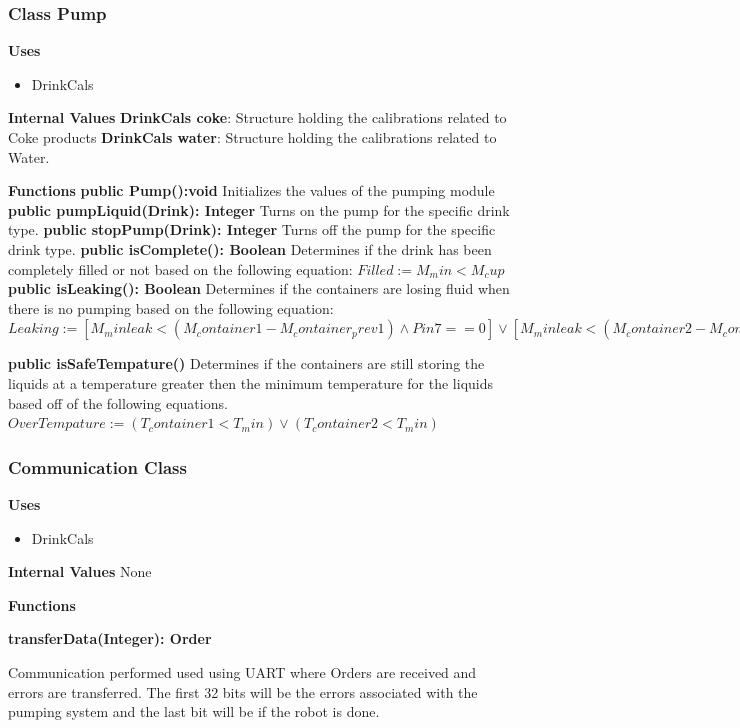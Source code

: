 \documentclass [10pt]{article}
\begin{document}
\subsubsection{Class Pump}

\textbf{Uses}

\begin{itemize}
	\item DrinkCals
\end{itemize}

\textbf{Internal Values}
\textbf{DrinkCals coke}: Structure holding the calibrations related to Coke products
\textbf{DrinkCals water}: Structure holding the calibrations related to Water.

\textbf{Functions}
\textbf{public Pump():void}
Initializes the values of the pumping module
\textbf{public pumpLiquid(Drink): Integer}
Turns on the pump for the specific drink type.
\textbf{public stopPump(Drink): Integer}
Turns off the pump for the specific drink type.
\textbf{public isComplete(): Boolean}
Determines if the drink has been completely filled or not based on the following equation:
$Filled := M_min < M_cup$
\textbf{public isLeaking(): Boolean}
Determines if the containers are losing fluid when there is no pumping based on the following equation:
$Leaking := [M_minleak < (M_container1 - M_container_prev1) \wedge Pin7 ==0] \vee [M_minleak < (M_container2 - M_container_prev2) \wedge Pin8 ==0] $


\textbf{public isSafeTempature()}
Determines if the containers are still storing the liquids at a temperature greater then the minimum temperature for the liquids based off of the following equations.
$OverTempature := (T_container1 < T_min) \vee (T_container2 < T_min)$ 


\subsubsection{Communication Class}

\textbf{Uses}

\begin{itemize}
	\item DrinkCals
\end{itemize}

\textbf{Internal Values}
 None

\textbf{Functions}

\textbf{transferData(Integer): Order}

Communication performed used using UART where Orders are received and errors are transferred. The first 32 bits will be the errors associated with the pumping system and the last bit will be if the robot is done.
\end{document}

